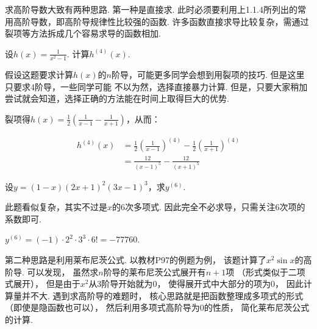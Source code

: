 求高阶导数大致有两种思路.
第一种是直接求. 此时必须要利用上1.1.4所列出的常用高阶导数，即高阶导规律性比较强的函数.
许多函数直接求导比较复杂，需通过裂项等方法拆成几个容易求导的函数相加.

\begin{example}
\label{ex:ch02-08}
设$h(x)=\frac{1}{x^2-1}$. 计算$h^{(4)}(x)$.
\end{example}

\begin{analysis}
假设这题要求计算$h(x)$的$n$阶导，可能更多同学会想到用裂项的技巧. 但是这里只要求4阶导，一些同学可能
不以为然，选择直接暴力计算.
但是，只要大家稍加尝试就会知道，选择正确的方法能在时间上取得巨大的优势.
\end{analysis}

\begin{solution}
裂项得$h(x)=\frac{1}{2}\left( \frac{1}{x-1} - \frac{1}{x+1} \right)$，从而：

\begin{equation}
    \begin{aligned}
        h^{(4)}(x)
        &= \frac{1}{2}\left( \frac{1}{x-1} \right)^{(4)} - \frac{1}{2}\left( \frac{1}{x+1} \right)^{(4)} \\
        &= \frac{12}{(x-1)^5} - \frac{12}{(x+1)^5}
        \nonumber
    \end{aligned}
\end{equation}
\end{solution}

\begin{example}
\label{ex:ch02-09}
设$y = (1-x)(2x+1)^2(3x-1)^3$，求$y^{(6)}$.
\end{example}

\begin{analysis}
此题看似复杂，其实不过是$x$的6次多项式. 因此完全不必求导，只需关注6次项的系数即可.
\end{analysis}

\begin{solution}
$y^{(6)} = (-1)\cdot 2^{2} \cdot 3^3 \cdot 6! = -77760$.
\end{solution}

第二种思路是利用莱布尼茨公式.
以教材P97的例题为例，
该题计算了$x^2\sin x$的高阶导.
可以发现，
虽然求$n$阶导的莱布尼茨公式展开有$n+1$项
（形式类似于二项式展开），
但是由于$x^2$从3阶导开始就为$0$，
使得展开式中大部分的项为$0$，
因此计算量并不大.
遇到求高阶导的难题时，
核心思路就是把函数整理成多项式的形式
（即使是隐函数也可以），
然后利用多项式高阶导为$0$的性质，
简化莱布尼茨公式的计算.

